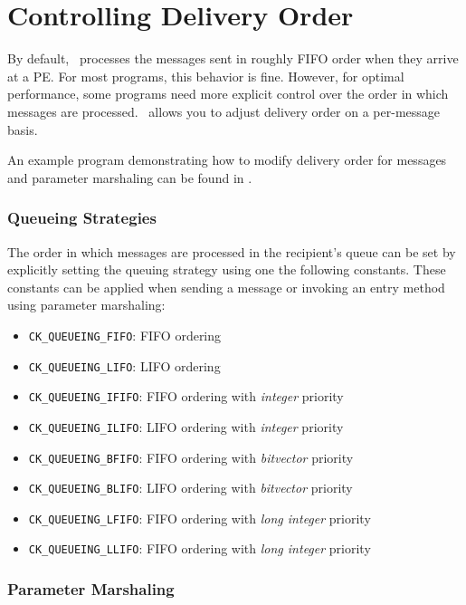 \section{Controlling Delivery Order}

By default, \charmpp\ processes the messages sent in roughly FIFO order when they arrive at a PE.  For most programs, this
behavior is fine. However, for optimal performance, some programs need more
explicit control over the order in which messages are processed. \charmpp\
allows you to adjust delivery order on a per-message basis.

An example program demonstrating how to modify delivery order for messages and
parameter marshaling can be found in \examplerefdir{prio}.

\subsubsection{Queueing Strategies}
\label{queueing strategies}

The order in which messages are processed in the recipient's queue can be set
by explicitly setting the queuing strategy using one the following
constants. These constants can be applied when sending a message or invoking an
entry method using parameter marshaling:

\begin{itemize}
\item \texttt{CK\_QUEUEING\_FIFO}: FIFO ordering
\item \texttt{CK\_QUEUEING\_LIFO}: LIFO ordering
\item \texttt{CK\_QUEUEING\_IFIFO}: FIFO ordering with \emph{integer} priority
\item \texttt{CK\_QUEUEING\_ILIFO}: LIFO ordering with \emph{integer} priority
\item \texttt{CK\_QUEUEING\_BFIFO}: FIFO ordering with \emph{bitvector} priority
\item \texttt{CK\_QUEUEING\_BLIFO}: LIFO ordering with \emph{bitvector} priority
\item \texttt{CK\_QUEUEING\_LFIFO}: FIFO ordering with \emph{long integer} priority
\item \texttt{CK\_QUEUEING\_LLIFO}: FIFO ordering with \emph{long integer} priority
\end{itemize}

\subsubsection{Parameter Marshaling}

